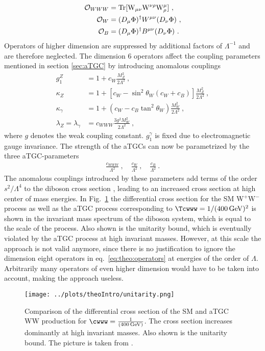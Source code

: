 \begin{align}
\mathcal{O}_{WWW} &= \rm{Tr}[W_{\mu\nu}W^{\nu\rho}W^\mu_\rho] ~, \\
\mathcal{O}_{W} &=  (D_\mu\Phi)^\dagger W^{\mu\nu}(D_\nu\Phi) ~, \\
\mathcal{O}_{B} &= (D_\mu\Phi)^\dagger B^{\mu\nu}(D_\nu\Phi) ~.
\end{align}
Operators of higher dimension are suppressed by additional factors of $\Lambda^{-1}$ and are therefore neglected. The dimension 6 operators affect the coupling parameters mentioned in section \ref{sec:aTGC} by introducing anomalous couplings
\begin{align}
g_1^Z &= 1 + c_W\frac{M_Z^2}{2\Lambda^2} ~, \\
\kappa_Z &= 1 + \left[ c_W - \sin^2\theta_W (c_W+c_B)\right] \frac{M_Z^2}{2\Lambda^2} ~, \\
\kappa_\gamma &= 1 + (c_W-c_B\tan^2\theta_W)\frac{M_W^2}{2\Lambda^2} ~, \\
\lambda_Z = \lambda_\gamma &= c_{WWW}\frac{3g^2M_W^2}{2\Lambda^2} ~, 
\end{align}
where $g$ denotes the weak coupling constant. $g_1^\gamma$ is fixed due to electromagnetic gauge invariance. The strength of the aTGCs can now be parametrized by the three aTGC-parameters
\begin{align}
\frac{c_{WWW}}{\Lambda^2} ~, \quad \frac{c_W}{\Lambda^2} ~, \quad \frac{c_B}{\Lambda^2} ~.
\end{align}
The anomalous couplings introduced by these parameters add terms of the order $s^2/\Lambda^4$ to the diboson cross section \cite{EFT}, leading to an increased cross section at high center of mass energies. In Fig.~\ref{fig:theo:unitarity} the differential cross section for the SM W$^+$W$^-$ process as well as the aTGC process corresponding to $\Tcwww = 1/(400 \, {\rm GeV})^{2}$ is shown in the invariant mass spectrum of the diboson system, which is equal to the scale of the process. Also shown is the unitarity bound, which is eventually violated by the aTGC process at high invariant masses. However, at this scale the approach is not valid anymore, since there is no justification to ignore the dimension eight operators in eq.~\ref{eq:theo:operators} at energies of the order of $\Lambda$. Arbitrarily many operators of even higher dimension would have to be taken into account, making the approach useless.\\
\begin{figure}
	\centering
	\texttt{[image: ../plots/theoIntro/unitarity.png]}
	\caption[Comparison of the differential cross section of the SM and aTGC WW production]{Comparison of the differential cross section of the SM and aTGC WW production for $\cwww=\frac{1}{(400\,{\rm GeV})}$. The cross section increases dominantly at high invariant masses. Also shown is the unitarity bound. The picture is taken from \cite{EFT}.}
	\label{fig:theo:unitarity}
\end{figure}

